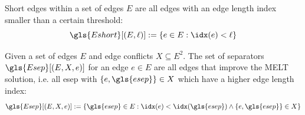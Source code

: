 
\begin{definition}
  \label{def:short_edges}
  Short edges within a set of edges \(E\) are all edges with an
  edge length index smaller than a certain threshold:
  \[
    \gls{Eshort}[(E, \ell)] := \{ e \in E : \idx(e) < \ell \}
  \]
\end{definition}



\begin{definition}[Separators]
  \label{def:separators}
  Given a set of edges \(E\) and edge conflicts \(X \subseteq E^2\). 
  The set of separators \(\gls{Esep}[(E, X, e)]\) for an edge 
  \(e \in E\) are all edges
  that improve the \gls{MELT} solution, i.e. all \gls{esep} with
  \(\{e,\gls{esep}\} \in X\) which have a higher edge length index:
  \[
	  \gls{Esep}[(E,X,e)] := \{
		  \gls{esep} \in E:
		  \idx(e) < \idx(\gls{esep}) \land \{e,\gls{esep}\} \in X
	  \}
  \]
\end{definition}




